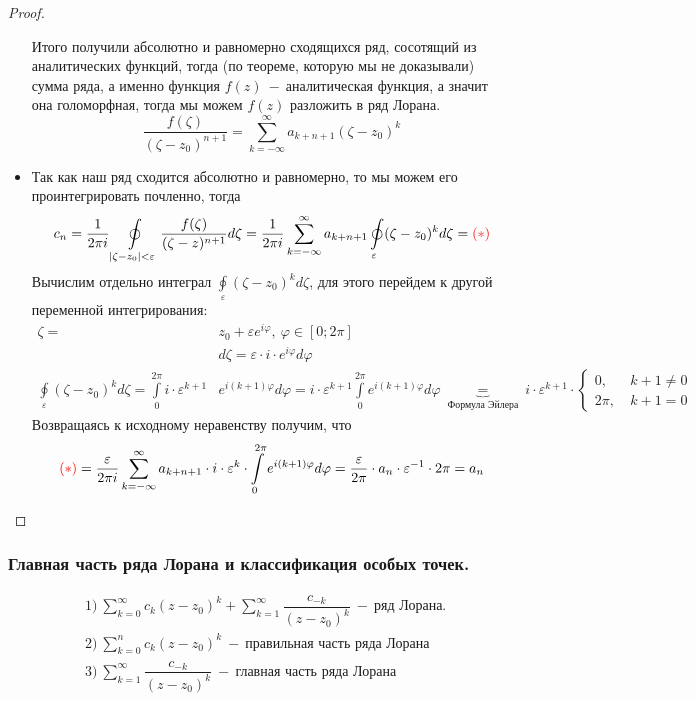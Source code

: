 \begin{proof}
\begin{itemize}
    Итого получили абсолютно и равномерно сходящихся ряд, сосотящий из аналитических функций, тогда (по теореме, которую мы не доказывали) сумма ряда, а именно функция $f(z)~-~$аналитическая функция, а значит она голоморфная, тогда мы можем $f(z)$ разложить в ряд Лорана.
    $$\dfrac{f(\zeta)}{(\zeta-z_0)^{n+1}}=\sum\limits_{k=-\infty}^\infty a_{k+n+1}(\zeta-z_0)^k$$
    \item Так как наш ряд сходится абсолютно и равномерно, то мы можем его проинтегрировать почленно, тогда
    $$c_n=\dfrac{1}{2\pi i}\oint\limits_{|\zeta-z_0|<\varepsilon}\dfrac{f(\zeta)}{(\zeta-z)^{n+1}}d\zeta=\dfrac{1}{2\pi i}\sum\limits_{k=-\infty}^{\infty}a_{k+n+1}\oint\limits_{\varepsilon}(\zeta-z_0)^{k}d\zeta=\textcolor{red}{(*)}$$
    Вычислим отдельно интеграл $\oint\limits_{\varepsilon}(\zeta-z_0)^{k}d\zeta$, для этого перейдем к другой переменной интегрирования:
    \begin{align}
        \zeta=&z_0+\varepsilon e^{i\varphi},\ \varphi\in[0;2\pi]
        \\
        &d\zeta=\varepsilon \cdot i\cdot e^{i\varphi}d\varphi
        \\
        \oint\limits_{\varepsilon}(\zeta-z_0)^{k}d\zeta=\int\limits_0^{2\pi}i\cdot\varepsilon^{k+1}&e^{i(k+1)\varphi}d\varphi=i\cdot\varepsilon^{k+1}\int\limits_0^{2\pi}e^{i(k+1)\varphi}d\varphi\ \underbrace{=}_{\text{Формула Эйлера}}\ i\cdot\varepsilon^{k+1}\cdot \begin{cases}
        0, &\ k+1\ne0\\
        2\pi,&\ k+1=0
        \end{cases}
    \end{align}
    Возвращаясь к исходному неравенству получим, что
    $$\textcolor{red}{(*)}=\dfrac{\varepsilon}{2\pi i}\sum\limits_{k=-\infty}^{\infty}a_{k+n+1}\cdot i\cdot\varepsilon^{k}\cdot \int\limits_0^{2\pi}e^{i(k+1)\varphi}d\varphi=\dfrac{\varepsilon}{2\pi}\cdot a_n\cdot \varepsilon^{-1}\cdot 2\pi=a_n$$
\end{itemize}
\end{proof}


\subsubsection{Главная часть ряда Лорана и классификация особых точек.}
\begin{definition*}
\begin{align}
    &1)\ \sum\limits_{k=0}^{\infty}c_k(z-z_0)^k+\sum\limits_{k=1}^\infty \dfrac{c_{-k}}{(z-z_0)^k}~-~\text{ряд Лорана}.
    \\
    &2)\ \sum\limits_{k=0}^{n}c_k(z-z_0)^k~-~\text{правильная часть ряда Лорана}
    \\
    &3)\ \sum\limits_{k=1}^\infty \dfrac{c_{-k}}{(z-z_0)^k}~-~\text{главная часть ряда Лорана}
\end{align}
\end{definition*}

